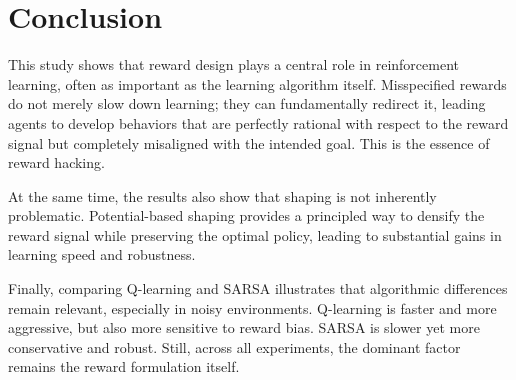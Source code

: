 \documentclass[10pt]{article}
\begin{document}
\section{Conclusion}

This study shows that reward design plays a central role in reinforcement learning, often as important as the learning algorithm itself. Misspecified rewards do not merely slow down learning; they can fundamentally redirect it, leading agents to develop behaviors that are perfectly rational with respect to the reward signal but completely misaligned with the intended goal. This is the essence of reward hacking.

At the same time, the results also show that shaping is not inherently problematic. Potential-based shaping provides a principled way to densify the reward signal while preserving the optimal policy, leading to substantial gains in learning speed and robustness.

Finally, comparing Q-learning and SARSA illustrates that algorithmic differences remain relevant, especially in noisy environments. Q-learning is faster and more aggressive, but also more sensitive to reward bias. SARSA is slower yet more conservative and robust. Still, across all experiments, the dominant factor remains the reward formulation itself.
\end{document}
